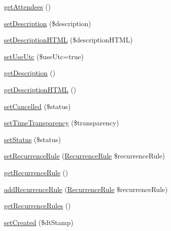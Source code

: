 \begin{DoxyCompactItemize}
\item 
\mbox{\hyperlink{class_eluceo_1_1i_cal_1_1_component_1_1_event_ac66aa81bc2f7351ff4e0c3c0d094f950}{get\+Attendees}} ()
\item 
\mbox{\hyperlink{class_eluceo_1_1i_cal_1_1_component_1_1_event_a508fb1d58b995b1864d8b02102ae3a93}{set\+Description}} (\$description)
\item 
\mbox{\hyperlink{class_eluceo_1_1i_cal_1_1_component_1_1_event_a82490c5b0b85400e224ccf51fbc322ff}{set\+Description\+H\+T\+ML}} (\$description\+H\+T\+ML)
\item 
\mbox{\hyperlink{class_eluceo_1_1i_cal_1_1_component_1_1_event_ad086e385a56e162445e662ccce2715b9}{set\+Use\+Utc}} (\$use\+Utc=true)
\item 
\mbox{\hyperlink{class_eluceo_1_1i_cal_1_1_component_1_1_event_ab0ee0f0236cf69196fcf15486d484b87}{get\+Description}} ()
\item 
\mbox{\hyperlink{class_eluceo_1_1i_cal_1_1_component_1_1_event_a4f61de8559b60de296b00c2ed5fc4e27}{get\+Description\+H\+T\+ML}} ()
\item 
\mbox{\hyperlink{class_eluceo_1_1i_cal_1_1_component_1_1_event_a1a81af119a481d672fe0f4ad2610a502}{set\+Cancelled}} (\$status)
\item 
\mbox{\hyperlink{class_eluceo_1_1i_cal_1_1_component_1_1_event_a7387669529b87eb196b4aae53e3b2782}{set\+Time\+Transparency}} (\$transparency)
\item 
\mbox{\hyperlink{class_eluceo_1_1i_cal_1_1_component_1_1_event_a52ea8343945673a010bd114d50399702}{set\+Status}} (\$status)
\item 
\mbox{\hyperlink{class_eluceo_1_1i_cal_1_1_component_1_1_event_a8301adc5310ee5a3281f40599607c86d}{set\+Recurrence\+Rule}} (\mbox{\hyperlink{class_eluceo_1_1i_cal_1_1_property_1_1_event_1_1_recurrence_rule}{Recurrence\+Rule}} \$recurrence\+Rule)
\item 
\mbox{\hyperlink{class_eluceo_1_1i_cal_1_1_component_1_1_event_a4414331a51599c2dd5432eba86008518}{get\+Recurrence\+Rule}} ()
\item 
\mbox{\hyperlink{class_eluceo_1_1i_cal_1_1_component_1_1_event_a204c48aab126855e3176ed4a796361be}{add\+Recurrence\+Rule}} (\mbox{\hyperlink{class_eluceo_1_1i_cal_1_1_property_1_1_event_1_1_recurrence_rule}{Recurrence\+Rule}} \$recurrence\+Rule)
\item 
\mbox{\hyperlink{class_eluceo_1_1i_cal_1_1_component_1_1_event_ae16e025ea3945376ce6a73084989d998}{get\+Recurrence\+Rules}} ()
\item 
\mbox{\hyperlink{class_eluceo_1_1i_cal_1_1_component_1_1_event_a8a9ac44bf639ae275bebae3ad22eb238}{set\+Created}} (\$dt\+Stamp)

\end{DoxyCompactItemize}
